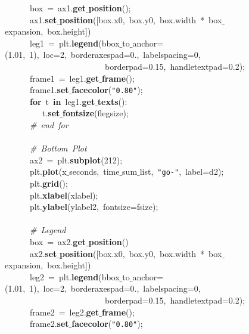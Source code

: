 \mbox{}\ \ \ \ \ \ box\ =\ ax1.\textbf{get$\_$position}(); \\
\mbox{}\ \ \ \ \ \ ax1.\textbf{set$\_$position}([box.x0,\ box.y0,\ box.width\ *\ box$\_$expansion,\ box.height]) \\
\mbox{}\ \ \ \ \ \ leg1\ =\ plt.\textbf{legend}(bbox$\_$to$\_$anchor=(1.01,\ 1),\ loc=2,\ borderaxespad=0.,\ labelspacing=0,\  \\
\mbox{}\ \ \ \ \ \ \ \ \ \ \ \ \ \ \ \ \ \ \ \ \ \ \ \ borderpad=0.15,\ handletextpad=0.2); \\
\mbox{}\ \ \ \ \ \ frame1\ =\ leg1.\textbf{get$\_$frame}(); \\
\mbox{}\ \ \ \ \ \ frame1.\textbf{set$\_$facecolor}(\texttt{"{}0.80"{}}); \\
\mbox{}\ \ \ \ \ \ \textbf{for}\ t\ \textbf{in}\ leg1.\textbf{get$\_$texts}(): \\
\mbox{}\ \ \ \ \ \ \ \ \ t.\textbf{set$\_$fontsize}(flegsize); \\
\mbox{}\ \ \ \ \ \ \textit{\#\ end\ for} \\
\mbox{}\ \ \ \ \ \  \\
\mbox{}\ \ \ \ \ \ \textit{\#\ Bottom\ Plot} \\
\mbox{}\ \ \ \ \ \ ax2\ =\ plt.\textbf{subplot}(212); \\
\mbox{}\ \ \ \ \ \ plt.\textbf{plot}(x$\_$seconds,\ time$\_$sum$\_$list,\ \texttt{"{}go-"{}},\ label=d2); \\
\mbox{}\ \ \ \ \ \ plt.\textbf{grid}(); \\
\mbox{}\ \ \ \ \ \ plt.\textbf{xlabel}(xlabel); \\
\mbox{}\ \ \ \ \ \ plt.\textbf{ylabel}(ylabel2,\ fontsize=fsize); \\
\mbox{}\ \ \ \ \ \  \\
\mbox{}\ \ \ \ \ \ \textit{\#\ Legend} \\
\mbox{}\ \ \ \ \ \ box\ =\ ax2.\textbf{get$\_$position}() \\
\mbox{}\ \ \ \ \ \ ax2.\textbf{set$\_$position}([box.x0,\ box.y0,\ box.width\ *\ box$\_$expansion,\ box.height]) \\
\mbox{}\ \ \ \ \ \ leg2\ =\ plt.\textbf{legend}(bbox$\_$to$\_$anchor=(1.01,\ 1),\ loc=2,\ borderaxespad=0.,\ labelspacing=0,\  \\
\mbox{}\ \ \ \ \ \ \ \ \ \ \ \ \ \ \ \ \ \ \ \ \ \ \ \ borderpad=0.15,\ handletextpad=0.2); \\
\mbox{}\ \ \ \ \ \ frame2\ =\ leg2.\textbf{get$\_$frame}(); \\
\mbox{}\ \ \ \ \ \ frame2.\textbf{set$\_$facecolor}(\texttt{"{}0.80"{}}); \\
